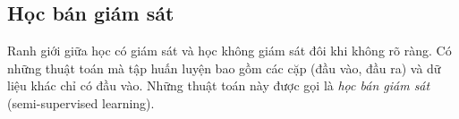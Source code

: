 





\subsection{Học bán giám sát}
Ranh giới giữa học có giám sát và học không giám sát đôi khi không rõ ràng. Có những thuật toán mà tập huấn luyện bao gồm các cặp (đầu vào, đầu ra) và dữ liệu khác chỉ có đầu vào. Những thuật toán này được gọi là \textit{học bán giám sát} (semi-supervised learning).


